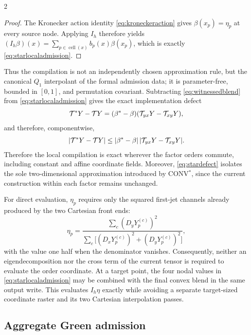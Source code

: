 \begin{multicols}{2}
\begin{proof}
The Kronecker action identity \eqref{eq:kroneckeraction} gives
\(\beta(x_p)=\eta_p\) at every source node. Applying \(I_h\) therefore yields
\((I_h\beta)(x)=\sum_{p\in\operatorname{cell}(x)}b_p(x)\beta(x_p)\), which is
exactly \eqref{eq:starlocaladmission}.
\end{proof}

Thus the compilation is not an independently chosen approximation rule, but
the canonical \(Q_1\) interpolant of the formal admission data; it is
parameter-free, bounded in \([0,1]\), and permutation covariant. Subtracting
\eqref{eq:witnessedblend} from \eqref{eq:starlocaladmission} gives the exact
implementation defect
\begin{equation}
 \mathcal{T}^*Y-\mathcal{T} Y
 = (\beta^*-\beta)(\mathcal{T}_{yx}Y-\mathcal{T}_{xy}Y),
 \label{eq:stardefect}
\end{equation}
and therefore, componentwise,
\begin{equation}
 |\mathcal{T}^*Y-\mathcal{T} Y|
 \leq |\beta^*-\beta|\,|\mathcal{T}_{yx}Y-\mathcal{T}_{xy}Y|.
 \label{eq:stardefectbound}
\end{equation}
Therefore the local compilation is exact wherever the factor orders commute,
including constant and affine coordinate fields. Moreover,
\eqref{eq:stardefect} isolates the sole two-dimensional approximation
introduced by CONV$^{*}$, since the current construction within each factor
remains unchanged.

For direct evaluation, \(\eta_p\) requires only the squared first-jet
channels already produced by the two Cartesian front ends:
\begin{equation}
 \eta_p=
 \frac{\sum_c(D_yY_p^{(c)})^2}
 {\sum_c\bigl[(D_xY_p^{(c)})^2+(D_yY_p^{(c)})^2\bigr]},
 \label{eq:stardirecteta}
\end{equation}
with the value one half when the denominator vanishes. Consequently, neither
an eigendecomposition nor the cross term of the current tensor is required
to evaluate the order coordinate. At a target point, the four nodal values
in \eqref{eq:starlocaladmission} may be combined with the final convex blend
in the same output write. This evaluates \(I_h\eta\) exactly while avoiding a
separate target-sized coordinate raster and its two Cartesian interpolation
passes.

\subsection{Aggregate Green admission}


\end{multicols}
